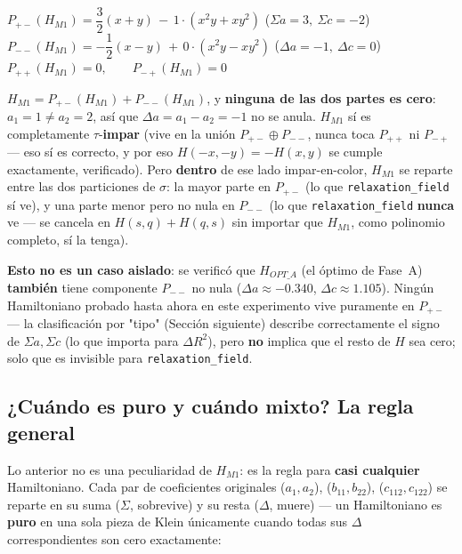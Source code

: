 \documentclass[11pt, a4paper]{article}
\begin{document}
\begin{tcolorbox}[codebox]
$P_{+-}(H_{M1}) = \dfrac{3}{2}(x{+}y) \,-\, 1\cdot(x^2y{+}xy^2)$
\hfill ($\Sigma a{=}3,\ \Sigma c{=}{-}2$) \\[4pt]
$P_{--}(H_{M1}) = -\dfrac{1}{2}(x{-}y) \,+\, 0\cdot(x^2y{-}xy^2)$
\hfill ($\Delta a{=}{-}1,\ \Delta c{=}0$) \\[4pt]
$P_{++}(H_{M1}) = 0, \qquad P_{-+}(H_{M1}) = 0$
\end{tcolorbox}

$H_{M1} = P_{+-}(H_{M1}) + P_{--}(H_{M1})$, y \textbf{ninguna de las
dos partes es cero}: $a_1=1\neq a_2=2$, as\'i que $\Delta a=a_1-a_2=-1$
no se anula. $H_{M1}$ s\'i es completamente $\tau$-\textbf{impar}
(vive en la uni\'on $P_{+-}\oplus P_{--}$, nunca toca $P_{++}$ ni
$P_{-+}$ --- eso s\'i es correcto, y por eso $H(-x,-y)=-H(x,y)$ se
cumple exactamente, verificado). Pero \textbf{dentro} de ese lado
impar-en-color, $H_{M1}$ se reparte entre las dos particiones de
$\sigma$: la mayor parte en $P_{+-}$ (lo que \texttt{relaxation\_field}
s\'i ve), y una parte menor pero no nula en $P_{--}$ (lo que
\texttt{relaxation\_field} \textbf{nunca} ve --- se cancela en
$H(s,q)+H(q,s)$ sin importar que $H_{M1}$, como polinomio completo,
s\'i la tenga).

\begin{tcolorbox}[quotebox]
  \textbf{Esto no es un caso aislado}: se verific\'o que
  $H_{OPT\_A}$ (el \'optimo de Fase~A) \textbf{tambi\'en} tiene
  componente $P_{--}$ no nula ($\Delta a\approx-0.340$,
  $\Delta c\approx1.105$). Ning\'un Hamiltoniano probado hasta ahora en
  este experimento vive puramente en $P_{+-}$ --- la clasificaci\'on
  por "tipo" (Secci\'on siguiente) describe correctamente el signo de
  $\Sigma a,\Sigma c$ (lo que importa para $\Delta R^2$), pero
  \textbf{no} implica que el resto de $H$ sea cero; solo que es
  invisible para \texttt{relaxation\_field}.
\end{tcolorbox}

\subsection{¿Cu\'ando es puro y cu\'ando mixto? La regla general}
\label{sec:regla-mixto}

Lo anterior no es una peculiaridad de $H_{M1}$: es la regla para
\textbf{casi cualquier} Hamiltoniano. Cada par de coeficientes
originales ($a_1,a_2$), ($b_{11},b_{22}$), ($c_{112},c_{122}$) se
reparte en su suma ($\Sigma$, sobrevive) y su resta ($\Delta$, muere)
--- un Hamiltoniano es \textbf{puro} en una sola pieza de Klein
\'unicamente cuando todas sus $\Delta$ correspondientes son cero
exactamente:
\end{document}
